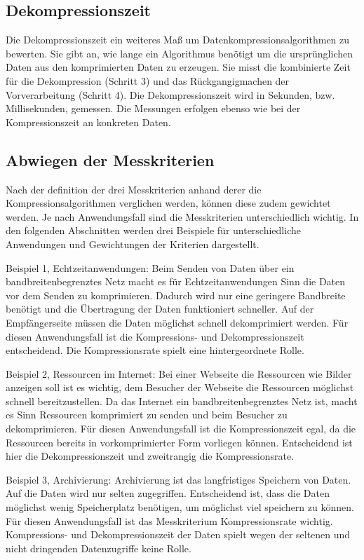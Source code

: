 \documentclass[conference]{IEEEtran}
\begin{document}

\subsection{Dekompressionszeit}

Die Dekompressionszeit ein weiteres Maß um Datenkompressionsalgorithmen zu bewerten.
Sie gibt an, wie lange ein Algorithmus benötigt um
die ursprünglichen Daten aus den komprimierten Daten zu erzeugen.
Sie misst die kombinierte Zeit für die Dekompression (Schritt 3) und das
Rückgangigmachen der Vorverarbeitung (Schritt 4).
Die Dekompressionszeit wird in Sekunden, bzw. Millisekunden, gemessen.
Die Messungen erfolgen ebenso wie bei der Kompressionszeit an konkreten Daten.

\subsection{Abwiegen der Messkriterien}

Nach der definition der drei Messkriterien anhand derer die
Kompressionsalgorithmen verglichen werden, können diese zudem gewichtet
werden.
Je nach Anwendungsfall sind die Messkriterien unterschiedlich wichtig.
In den folgenden Abschnitten werden drei Beispiele für unterschiedliche
Anwendungen und Gewichtungen der Kriterien dargestellt.

Beispiel 1, Echtzeitanwendungen:
Beim Senden von Daten über ein bandbreitenbegrenztes Netz macht es für
Echtzeitanwendungen Sinn die Daten vor dem Senden zu komprimieren.
Dadurch wird nur eine geringere Bandbreite benötigt und die Übertragung der
Daten funktioniert schneller.
Auf der Empfängerseite müssen die Daten möglichst schnell dekomprimiert werden.
Für diesen Anwendungsfall ist die Kompressions- und Dekompressionszeit entscheidend.
Die Kompressionsrate spielt eine hintergeordnete Rolle.

Beispiel 2, Ressourcen im Internet:
Bei einer Webseite die Ressourcen wie Bilder anzeigen soll ist es wichtig,
dem Besucher der Webseite die Ressourcen möglichst schnell bereitzustellen.
Da das Internet ein bandbreitenbegrenztes Netz ist, macht es Sinn Ressourcen komprimiert
zu senden und beim Besucher zu dekomprimieren.
Für diesen Anwendungsfall ist die Kompressionszeit egal, da die Ressourcen
bereits in vorkomprimierter Form vorliegen können.
Entscheidend ist hier die Dekompressionszeit und zweitrangig die Kompressionsrate.

Beispiel 3, Archivierung:
Archivierung ist das langfristiges Speichern von Daten.
Auf die Daten wird nur selten zugegriffen.
Entscheidend ist, dass die Daten möglichst wenig Speicherplatz benötigen,
um möglichst viel speichern zu können.
Für diesen Anwendungsfall ist das Messkriterium Kompressionsrate wichtig.
Kompressions- und Dekompressionszeit der Daten spielt wegen der seltenen und
nicht dringenden Datenzugriffe keine Rolle.
\end{document}
